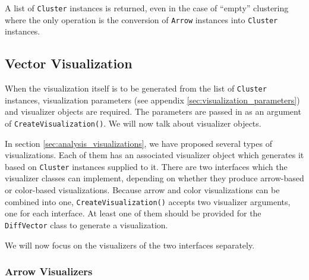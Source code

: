 A list of \verb+Cluster+ instances is returned, even in the case of ``empty'' clustering where the only operation is the conversion of \verb+Arrow+ instances into \verb+Cluster+ instances.

\subsection{Vector Visualization}
\label{sec:implementation_visualizers}

When the visualization itself is to be generated from the list of \verb+Cluster+ instances, visualization parameters (see appendix \ref{sec:visualization_parameters}) and visualizer objects are required. The parameters are passed in as an argument of \verb+CreateVisualization()+. We will now talk about visualizer objects.

In section \ref{sec:analysis_visualizations}, we have proposed several types of visualizations. Each of them has an associated visualizer object which generates it based on \verb+Cluster+ instances supplied to it. There are two interfaces which the visualizer classes can implement, depending on whether they produce arrow-based or color-based visualizations. Because arrow and color visualizations can be combined into one, \verb+CreateVisualization()+ accepts two visualizer arguments, one for each interface\footnotemark. At least one of them should be provided for the \verb+DiffVector+ class to generate a visualization.


We will now focus on the visualizers of the two interfaces separately.

\subsubsection{Arrow Visualizers}

